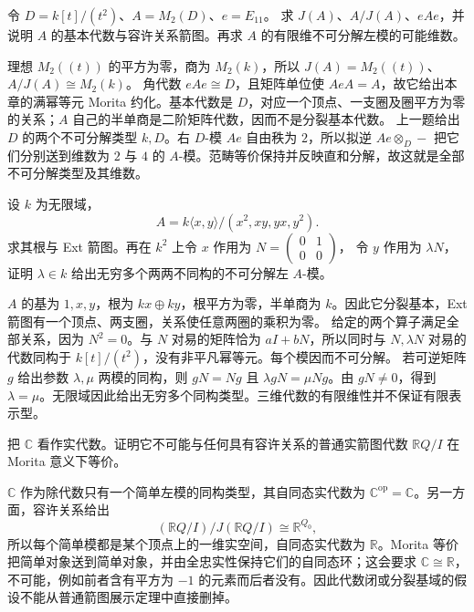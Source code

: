 \begin{exercise}\label{b5:ex:09-matrix-dual-basic}
	令 \(D=k[t]/(t^2)\)、\(A=M_2(D)\)、\(e=E_{11}\)。 求 \(J(A)\)、\(A/J(A)\)、\(eAe\)，并说明 \(A\) 的基本代数与容许关系箭图。再求 \(A\) 的有限维不可分解左模的可能维数。
\end{exercise}
\begin{solution}
	理想 \(M_2((t))\) 的平方为零，商为 \(M_2(k)\)，所以 \(J(A)=M_2((t))\)、\(A/J(A)\cong M_2(k)\)。 角代数 \(eAe\cong D\)，且矩阵单位使 \(AeA=A\)，故它给出本章的满幂等元 Morita 约化。基本代数是 \(D\)，对应一个顶点、一支圈及圈平方为零的关系；\(A\) 自己的半单商是二阶矩阵代数，因而不是分裂基本代数。 上一题给出 \(D\) 的两个不可分解类型 \(k,D\)。右 \(D\)-模 \(Ae\) 自由秩为 \(2\)，所以拟逆 \(Ae\otimes_D-\) 把它们分别送到维数为 \(2\) 与 \(4\) 的 \(A\)-模。范畴等价保持并反映直和分解，故这就是全部不可分解类型及其维数。
\end{solution}

\begin{exercise}\label{b5:ex:09-radical-square-zero-family}
	设 \(k\) 为无限域，
	\[
		A=k\langle x,y\rangle/(x^2,xy,yx,y^2).
	\]
	求其根与 Ext 箭图。再在 \(k^2\) 上令 \(x\) 作用为
	\(N=\left(\begin{smallmatrix}0&1\\0&0\end{smallmatrix}\right)\)，
	令 \(y\) 作用为 \(\lambda N\)，证明 \(\lambda\in k\) 给出无穷多个两两不同构的不可分解左 \(A\)-模。
\end{exercise}
\begin{solution}
	\(A\) 的基为 \(1,x,y\)，根为 \(kx\oplus ky\)，根平方为零，半单商为 \(k\)。因此它分裂基本，Ext 箭图有一个顶点、两支圈，关系使任意两圈的乘积为零。 给定的两个算子满足全部关系，因为 \(N^2=0\)。与 \(N\) 对易的矩阵恰为 \(aI+bN\)，所以同时与 \(N,\lambda N\) 对易的代数同构于 \(k[t]/(t^2)\)，没有非平凡幂等元。每个模因而不可分解。 若可逆矩阵 \(g\) 给出参数 \(\lambda,\mu\) 两模的同构，则 \(gN=Ng\) 且 \(\lambda gN=\mu Ng\)。由 \(gN\neq0\)，得到 \(\lambda=\mu\)。无限域因此给出无穷多个同构类型。三维代数的有限维性并不保证有限表示型。
\end{solution}

\begin{exercise}\label{b5:ex:09-nonsplit-field-obstruction}
	把 \(\mathbb C\) 看作实代数。证明它不可能与任何具有容许关系的普通实箭图代数 \(\mathbb RQ/I\) 在 Morita 意义下等价。
\end{exercise}
\begin{solution}
	\(\mathbb C\) 作为除代数只有一个简单左模的同构类型，其自同态实代数为 \(\mathbb C^{\mathrm{op}}=\mathbb C\)。另一方面，容许关系给出
	\[
		(\mathbb RQ/I)/J(\mathbb RQ/I)\cong\mathbb R^{Q_0},
	\]
	所以每个简单模都是某个顶点上的一维实空间，自同态实代数为 \(\mathbb R\)。Morita 等价把简单对象送到简单对象，并由全忠实性保持它们的自同态环；这会要求 \(\mathbb C\cong\mathbb R\)，不可能，例如前者含有平方为 \(-1\) 的元素而后者没有。因此代数闭或分裂基域的假设不能从普通箭图展示定理中直接删掉。
\end{solution}

